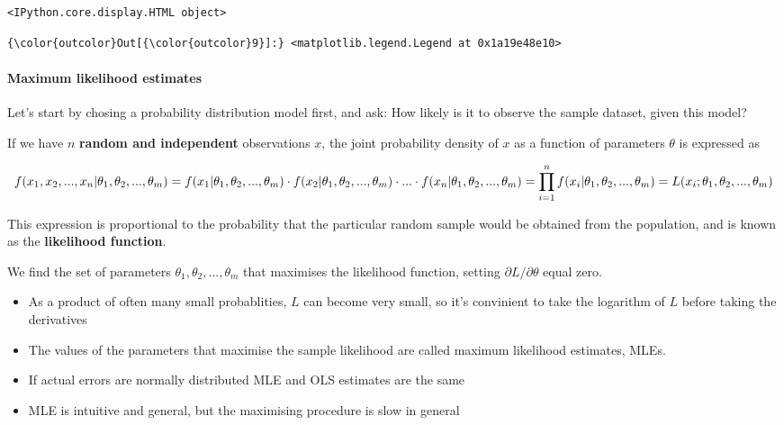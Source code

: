 \documentclass[11pt]{article}
\providecommand{\tightlist}{%
      \setlength{\itemsep}{0pt}\setlength{\parskip}{0pt}}
\begin{document}
    
    
    \begin{verbatim}
<IPython.core.display.HTML object>
    \end{verbatim}

    
\begin{Verbatim}[commandchars=\\\{\}]
{\color{outcolor}Out[{\color{outcolor}9}]:} <matplotlib.legend.Legend at 0x1a19e48e10>
\end{Verbatim}
            
    \paragraph{Maximum likelihood
estimates}\label{maximum-likelihood-estimates}

Let's start by chosing a probability distribution model first, and ask:
How likely is it to observe the sample dataset, given this model?

If we have \(n\) \textbf{random and independent} observations \(x\), the
joint probability density of \(x\) as a function of parameters
\(\theta\) is expressed as

\[f(x_1, x_2, ...,x_n | \theta_1,\theta_2,...,\theta_m)
\\= f(x_1 | \theta_1,\theta_2,...,\theta_m) \cdot f(x_2 | \theta_1,\theta_2,...,\theta_m) \cdot ... \cdot f(x_n | \theta_1,\theta_2,...,\theta_m)
\\= \prod_{i=1}^{n} f(x_i | \theta_1,\theta_2,...,\theta_m)
\\= L(x_i; \theta_1,\theta_2,...,\theta_m)\]

This expression is proportional to the probability that the particular
random sample would be obtained from the population, and is known as the
\textbf{likelihood function}.

We find the set of parameters \(\theta_1,\theta_2,...,\theta_m\) that
maximises the likelihood function, setting
\(\partial L / \partial \theta\) equal zero.

\begin{itemize}
\tightlist
\item
  As a product of often many small probablities, \(L\) can become very
  small, so it's convinient to take the logarithm of \(L\) before taking
  the derivatives
\item
  The values of the parameters that maximise the sample likelihood are
  called maximum likelihood estimates, MLEs.
\item
  If actual errors are normally distributed MLE and OLS estimates are
  the same
\item
  MLE is intuitive and general, but the maximising procedure is slow in
  general
\end{itemize}
\end{document}
